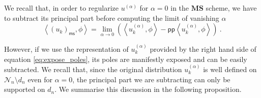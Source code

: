 \documentclass[11pt]{book}
\newcommand{\pp}{\mathsf{pp}}
\newcommand{\ms}{\mathsf{ms}}
\newcommand{\MS}{\textbf{MS}}
\newcommand{\sm}[1]{\left\langle#1\right\rangle}
\newcommand{\Ncal}{\mathcal{N}}
\theoremstyle{break}
\begin{document}
\bigskip


We recall that, in order to regularize $u^{(\alpha)}$ for $\alpha=0$ in the $\MS$ scheme, we have to subtract its principal part before computing the limit of vanishing $\alpha$
%
\begin{equation*}
\sm{ (u_k)_\ms, \phi } = \lim_{\alpha \to 0} \left( \sm{ u^{(\alpha)}_k, \phi } - \pp\sm{ u^{(\alpha)}_k , \phi } \right) \ .
\end{equation*}


However, if we use the representation of $u^{(\alpha)}_k$ provided by the right hand side of equation \eqref{eq:expose_poles}, its poles are manifestly exposed and can be easily subtracted. We recall that, since the original distribution $u^{(\alpha)}_k$ is well defined on $\Ncal_n\setminus d_n$ even for $\alpha=0$, the principal part we are subtracting can only be supported on $d_n$. We summarise this discussion in the following proposition.
\end{document}
